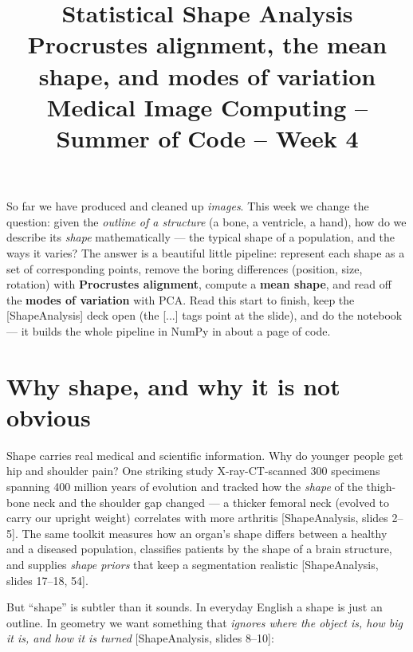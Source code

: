 \documentclass[11pt]{article}
\title{\textbf{Statistical Shape Analysis}\\[2pt]
\large Procrustes alignment, the mean shape, and modes of variation\\[6pt]
\normalsize Medical Image Computing -- Summer of Code -- Week 4}
\author{}
\date{}
\newcommand{\deck}[1]{\textsf{\small[#1]}}
\begin{document}
\maketitle
\vspace{-2.2em}

\begin{keybox}
So far we have produced and cleaned up \emph{images}. This week we change the
question: given the \emph{outline of a structure} (a bone, a ventricle, a hand),
how do we describe its \emph{shape} mathematically --- the typical shape of a
population, and the ways it varies? The answer is a beautiful little pipeline:
represent each shape as a set of corresponding points, remove the boring
differences (position, size, rotation) with \textbf{Procrustes alignment},
compute a \textbf{mean shape}, and read off the \textbf{modes of variation} with
PCA. Read this start to finish, keep the \deck{ShapeAnalysis} deck open (the
\deck{...} tags point at the slide), and do the notebook --- it builds the whole
pipeline in NumPy in about a page of code.
\end{keybox}

\tableofcontents
\bigskip

\section{Why shape, and why it is not obvious}

Shape carries real medical and scientific information. Why do younger people get
hip and shoulder pain? One striking study X-ray-CT-scanned 300 specimens
spanning 400 million years of evolution and tracked how the \emph{shape} of the
thigh-bone neck and the shoulder gap changed --- a thicker femoral neck (evolved
to carry our upright weight) correlates with more arthritis
\deck{ShapeAnalysis, slides 2--5}. The same toolkit measures how an organ's
shape differs between a healthy and a diseased population, classifies patients
by the shape of a brain structure, and supplies \emph{shape priors} that keep a
segmentation realistic \deck{ShapeAnalysis, slides 17--18, 54}.

But ``shape'' is subtler than it sounds. In everyday English a shape is just an
outline. In geometry we want something that \emph{ignores where the object is,
how big it is, and how it is turned} \deck{ShapeAnalysis, slides 8--10}:
\end{document}
